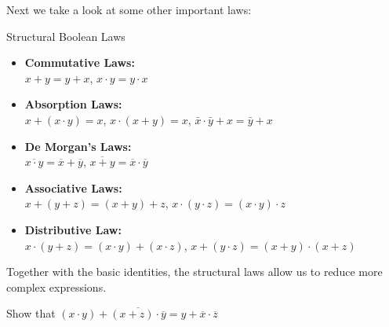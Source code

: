 Next we take a look at some other important laws:

\begin{custombox}{Structural Boolean Laws}
\begin{itemize}
    \item \textbf{Commutative Laws:} \\
    \hspace*{15pt}$x + y = y + x$, \quad $x \cdot y = y \cdot x$
    
    \item \textbf{Absorption Laws:} \\
    \hspace*{15pt}$x + (x \cdot y) = x$, \quad $x \cdot (x + y) = x$, \quad $\bar{x} \cdot \bar{y}+x=\bar{y}+x$
    
    \item \textbf{De Morgan’s Laws:} \\
    \hspace*{15pt} $\overline{x \cdot y} = \overline{x} + \overline{y}$, \quad $\overline{x + y} = \overline{x} \cdot \overline{y}$
    \item \textbf{Associative Laws:} \\
    \hspace*{15pt} $x + (y + z) = (x + y) + z$, \quad $x \cdot (y \cdot z) = (x \cdot y) \cdot z$
    
    \item \textbf{Distributive Law:} \\
    \hspace*{15pt} $x \cdot (y + z) = (x \cdot y) + (x \cdot z)$, \quad $x + (y \cdot z) = (x + y) \cdot (x + z)$
\end{itemize}
\end{custombox}

Together with the basic identities, the structural laws allow us to reduce more complex expressions.

\begin{example}
    Show that
    \(
    (x \cdot y) + \overline{(x + z) \cdot \overline{y}} = y + \overline{x} \cdot \overline{z}
    \)
\end{example}

